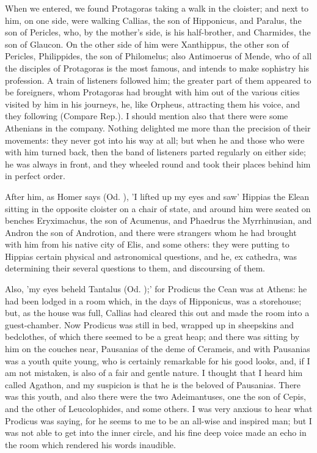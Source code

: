 \documentclass[11pt,letter]{article}
\begin{document}
\par  When we entered, we found Protagoras taking a walk in the cloister; and next to him, on one side, were walking Callias, the son of Hipponicus, and Paralus, the son of Pericles, who, by the mother's side, is his half-brother, and Charmides, the son of Glaucon. On the other side of him were Xanthippus, the other son of Pericles, Philippides, the son of Philomelus; also Antimoerus of Mende, who of all the disciples of Protagoras is the most famous, and intends to make sophistry his profession. A train of listeners followed him; the greater part of them appeared to be foreigners, whom Protagoras had brought with him out of the various cities visited by him in his journeys, he, like Orpheus, attracting them his voice, and they following (Compare Rep.). I should mention also that there were some Athenians in the company. Nothing delighted me more than the precision of their movements: they never got into his way at all; but when he and those who were with him turned back, then the band of listeners parted regularly on either side; he was always in front, and they wheeled round and took their places behind him in perfect order.

\par  After him, as Homer says (Od. ), 'I lifted up my eyes and saw' Hippias the Elean sitting in the opposite cloister on a chair of state, and around him were seated on benches Eryximachus, the son of Acumenus, and Phaedrus the Myrrhinusian, and Andron the son of Androtion, and there were strangers whom he had brought with him from his native city of Elis, and some others: they were putting to Hippias certain physical and astronomical questions, and he, ex cathedra, was determining their several questions to them, and discoursing of them.

\par  Also, 'my eyes beheld Tantalus (Od. );' for Prodicus the Cean was at Athens: he had been lodged in a room which, in the days of Hipponicus, was a storehouse; but, as the house was full, Callias had cleared this out and made the room into a guest-chamber. Now Prodicus was still in bed, wrapped up in sheepskins and bedclothes, of which there seemed to be a great heap; and there was sitting by him on the couches near, Pausanias of the deme of Cerameis, and with Pausanias was a youth quite young, who is certainly remarkable for his good looks, and, if I am not mistaken, is also of a fair and gentle nature. I thought that I heard him called Agathon, and my suspicion is that he is the beloved of Pausanias. There was this youth, and also there were the two Adeimantuses, one the son of Cepis, and the other of Leucolophides, and some others. I was very anxious to hear what Prodicus was saying, for he seems to me to be an all-wise and inspired man; but I was not able to get into the inner circle, and his fine deep voice made an echo in the room which rendered his words inaudible.
\end{document}
